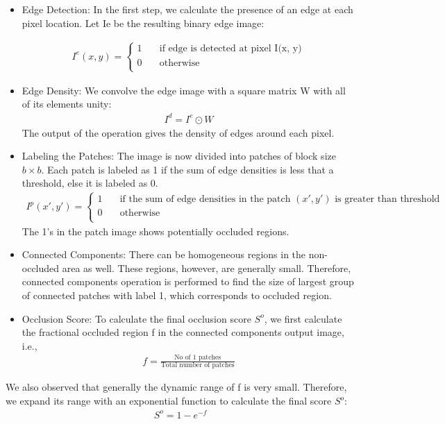\documentclass{sig-alternate-05-2015}
\begin{document}
\begin{itemize}
\item Edge Detection: In the first step, we calculate the presence of
an edge at each pixel location. Let Ie be the resulting binary
edge image:

\begin{eqnarray}
I^e(x,y)=
\begin{cases}
	1 &\quad\text{if edge is detected at pixel I(x, y)}\\
	0 &\quad\text{otherwise}\\
\end{cases}
\end{eqnarray}

\item Edge Density: We convolve the edge image with a square
matrix W with all of its elements unity:
\begin{eqnarray}
I^d = I^e\odot W
\end{eqnarray}
The output of the operation gives the density of edges around
each pixel.
\item Labeling the Patches: The image is now divided into patches
of block size $b\times b$. Each patch is labeled as 1 if the sum of
edge densities is less that a threshold, else it is labeled as 0.
\begin{eqnarray}
I^p(x',y')=
\begin{cases}
	1 &\quad\text{if the sum of edge densities in the
patch $(x',y')$ is greater than threshold}\\
	0 &\quad\text{otherwise}\\
\end{cases}
\end{eqnarray}
The 1's in the patch image shows potentially occluded regions.
\item Connected Components: There can be homogeneous regions
in the non-occluded area as well. These regions, however, are
generally small. Therefore, connected components operation
is performed to find the size of largest group of connected
patches with label 1, which corresponds to occluded region.
\item Occlusion Score: To calculate the final occlusion score $S^o$,
we first calculate the fractional occluded region f in the connected
components output image, i.e.,
\begin{eqnarray}
f=\frac{\text{No of 1 patches}}{\text{Total number of patches}}
\end{eqnarray}
\end{itemize}
We also observed that generally the dynamic range of f is very
small. Therefore, we expand its range with an exponential function
to calculate the final score $S^o$:
\begin{eqnarray}
S^o = 1- e^{-f}
\end{eqnarray}
\end{document}
